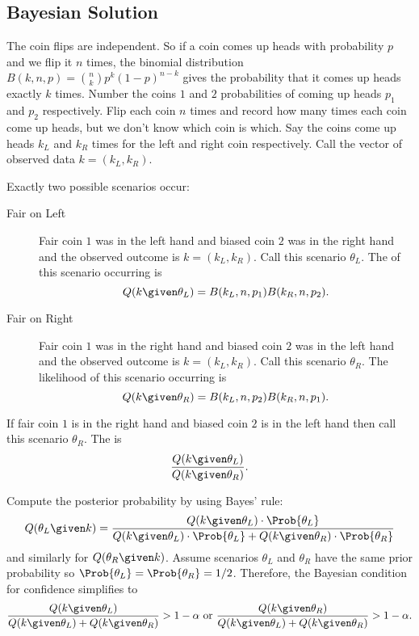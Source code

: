 \documentclass[12pt]{article}
\begin{document}
\subsection*{Bayesian Solution}

The coin flips are independent.  So if a coin comes up heads with
probability \( p \) and we flip it \( n \) times, the binomial
distribution \( B(k, n, p) = \binom{n}{k} p^k(1-p)^{n-k} \) gives the
probability that it comes up heads exactly \( k \) times.  Number the
coins \( 1 \) and \( 2 \) probabilities of coming up heads \( p_{1} \)
and \( p_{2} \) respectively.  Flip each coin \( n \) times and record
how many times each coin come up heads, but we don't know which coin is
which.  Say the coins come up heads \( k_{L} \) and \( k_{R} \) times
for the left and right coin respectively.  Call the vector of observed
data \( k = (k_L, k_R) \).

Exactly two possible scenarios occur:
\begin{description}
    \item[Fair on Left]
        Fair coin \( 1 \) was in the left hand and biased coin \( 2 \)
        was in the right hand and the observed outcome is \( k = (k_L, k_R)
        \).  Call this scenario \( \theta_L \).  The 
        of this scenario occurring is
        \[
            Q(k \given \theta_L) = B(k_L, n, p_1)B(k_R, n, p_2).
        \]
    \item[Fair on Right]
        Fair coin \( 1 \) was in the right hand and biased coin \( 2 \)
        was in the left hand and the observed outcome is \( k = (k_L, k_R)
        \).  Call this scenario \( \theta_R \).  The likelihood of this
        scenario occurring is
        \[
            Q(k \given \theta_R) = B(k_L, n, p_2)B(k_R, n, p_1).
        \]
\end{description}
If fair coin \( 1 \) is in the right hand and biased coin \( 2 \) is in
the left hand then call this scenario \( \theta_R \).  The  is
\[
    \frac{Q(k \given \theta_L)}{Q(k \given \theta_R)}.
\]

Compute the posterior probability by using Bayes’ rule:
\[
    Q( \theta_L \given k ) = \frac{Q(k \given \theta_L) \cdot \Prob{\theta_L}}
    {Q(k \given \theta_L ) \cdot \Prob{\theta_L} + Q(k \given \theta_R )
    \cdot \Prob{\theta_R}}
\] and similarly for \( Q( \theta_R \given k ) \).%
Assume scenarios \( \theta_L \) and \( \theta_R \) have the same prior
probability so \( \Prob{\theta_L} = \Prob{\theta_R} = 1/2 \). Therefore,
the Bayesian condition for confidence simplifies to
\[
    \frac{Q(k \given \theta_L)}{Q(k \given \theta_L) + Q(k \given \theta_R)
    } > 1- \alpha \text{ or } \frac{Q(k \given \theta_R)}{Q(k \given
    \theta_L ) + Q(k \given \theta_R) } > 1- \alpha.
\]
\end{document}
